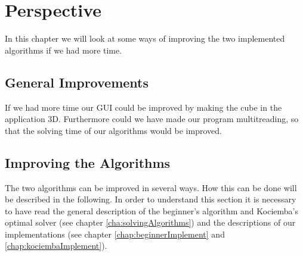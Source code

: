 \chapter{Perspective}
In this chapter we will look at some ways of improving the two implemented algorithms if we had more time. 

\section{General Improvements}
If we had more time our GUI could be improved by making the cube in the application 3D. Furthermore could we have made our program multitreading, so that the solving time of our algorithms would be improved.


\section{Improving the Algorithms}
The two algorithms can be improved in several ways. How this can be done will be described in the following.
In order to understand this section it is necessary to have read the general description of the beginner's algorithm and Kociemba's optimal solver (see chapter \ref{cha:solvingAlgorithms}) and the descriptions of our implementations (see chapter \ref{chap:beginnerImplement} and \ref{chap:kociembaImplement}).


